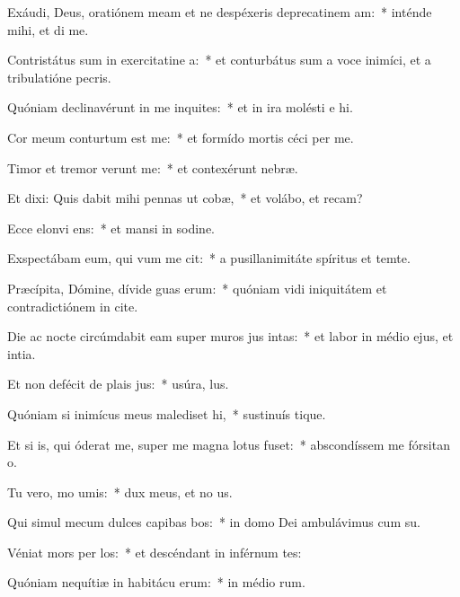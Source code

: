 \item Exáudi, Deus, oratiónem meam et ne despéxeris deprecatinem am:~* inténde mihi, et di me.
\item Contristátus sum in exercitatine a:~* et conturbátus sum a voce inimíci, et a tribulatióne pecris.
\item Quóniam declinavérunt in me inquites:~* et in ira molésti e hi.
\item Cor meum conturtum est  me:~* et formído mortis céci per me.
\item Timor et tremor verunt  me:~* et contexérunt  nebræ.
\item Et dixi: Quis dabit mihi pennas ut cobæ,~* et volábo, et recam?
\item Ecce elonvi ens:~* et mansi in sodine.
\item Exspectábam eum, qui vum me cit:~* a pusillanimitáte spíritus et temte.
\item Præcípita, Dómine, dívide guas erum:~* quóniam vidi iniquitátem et contradictiónem in cite.
\item Die ac nocte circúmdabit eam super muros jus intas:~* et labor in médio ejus, et intia.
\item Et non defécit de plais jus:~* usúra,  lus.
\item Quóniam si inimícus meus malediset hi,~* sustinuís tique.
\item Et si is, qui óderat me, super me magna lotus fuset:~* abscondíssem me fórsitan  o.
\item Tu vero, mo umis:~* dux meus, et no us.
\item Qui simul mecum dulces capibas bos:~* in domo Dei ambulávimus cum su.
\item Véniat mors per los:~* et descéndant in inférnum tes:
\item Quóniam nequítiæ in habitácu erum:~* in médio rum.
